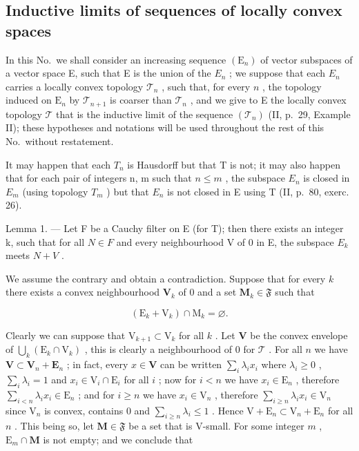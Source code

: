 \subsection{Inductive limits of sequences of locally convex spaces}

In this No.~we shall consider an increasing sequence \((\mathrm{E}_{n})\) of vector subspaces of a vector space E, such that E is the union of the \(E_{n}\) ; we suppose that each \(E_{n}\) carries a locally convex topology \(\mathcal{T}_n\) , such that, for every \(n\) , the topology induced on \(\mathrm{E}_n\) by \(\mathcal{T}_{n+1}\) is coarser than \(\mathcal{T}_n\) , and we give to E the locally convex topology \(\mathcal{T}\) that is the inductive limit of the sequence \((\mathcal{T}_n)\) (II, p.~29, Example II); these hypotheses and notations will be used throughout the rest of this No.~without restatement.

It may happen that each \(T_{n}\) is Hausdorff but that T is not; it may also happen that for each pair of integers n, m such that \(n \leqslant m\) , the subspace \(E_{n}\) is closed in \(E_{m}\) (using topology \(T_{m}\) ) but that \(E_{n}\) is not closed in E using T (II, p.~80, exerc. 26).

Lemma 1. --- Let F be a Cauchy filter on E (for T); then there exists an integer k, such that for all \(N \in F\) and every neighbourhood V of 0 in E, the subspace \(E_{k}\) meets \(N + V\) .

We assume the contrary and obtain a contradiction. Suppose that for every \(k\) there exists a convex neighbourhood \(\mathbf{V}_k\) of 0 and a set \(\mathbf{M}_k \in \mathfrak{F}\) such that

\[
\left(\mathrm{E} _ {k} + \mathrm{V} _ {k}\right) \cap \mathrm{M} _ {k} = \varnothing .
\]

Clearly we can suppose that \(\mathrm{V}_{k + 1} \subset \mathrm{V}_k\) for all \(k\) . Let \(\mathbf{V}\) be the convex envelope of \(\bigcup_{k} (\mathrm{E}_k \cap \mathrm{V}_k)\) , this is clearly a neighbourhood of 0 for \(\mathcal{T}\) . For all \(n\) we have \(\mathbf{V} \subset \mathbf{V}_n + \mathbf{E}_n\) ; in fact, every \(x \in \mathbf{V}\) can be written \(\sum_{i} \lambda_i x_i\) where \(\lambda_i \geqslant 0\) , \(\sum_{i} \lambda_i = 1\) and \(x_i \in \mathrm{V}_i \cap \mathrm{E}_i\) for all \(i\) ; now for \(i < n\) we have \(x_i \in \mathrm{E}_n\) , therefore \(\sum_{i < n} \lambda_i x_i \in \mathrm{E}_n\) ; and for \(i \geqslant n\) we have \(x_i \in \mathrm{V}_n\) , therefore \(\sum_{i \geqslant n} \lambda_i x_i \in \mathrm{V}_n\) since \(\mathrm{V}_n\) is convex, contains 0 and \(\sum_{i \geqslant n} \lambda_i \leqslant 1\) . Hence \(\mathrm{V} + \mathrm{E}_n \subset \mathrm{V}_n + \mathrm{E}_n\) for all \(n\) . This being so, let \(\mathbf{M} \in \mathfrak{F}\) be a set that is V-small. For some integer \(m\) , \(\mathrm{E}_m \cap \mathbf{M}\) is not empty; and we conclude that

